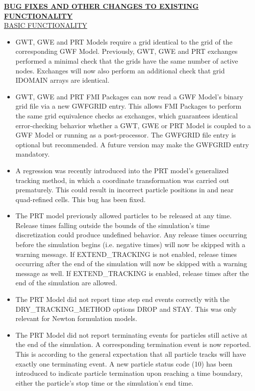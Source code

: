 \textbf{\underline{BUG FIXES AND OTHER CHANGES TO EXISTING FUNCTIONALITY}} \\
\underline{BASIC FUNCTIONALITY}
\begin{itemize}
	\item GWT, GWE and PRT Models require a grid identical to the grid of the corresponding GWF Model. Previously, GWT, GWE and PRT exchanges performed a minimal check that the grids have the same number of active nodes. Exchanges will now also perform an additional check that grid IDOMAIN arrays are identical.
	\item GWT, GWE and PRT FMI Packages can now read a GWF Model's binary grid file via a new GWFGRID entry. This allows FMI Packages to perform the same grid equivalence checks as exchanges, which guarantees identical error-checking behavior whether a GWT, GWE or PRT Model is coupled to a GWF Model or running as a post-processor. The GWFGRID file entry is optional but recommended. A future version may make the GWFGRID entry mandatory.
	\item A regression was recently introduced into the PRT model's generalized tracking method, in which a coordinate transformation was carried out prematurely. This could result in incorrect particle positions in and near quad-refined cells. This bug has been fixed.
	\item The PRT model previously allowed particles to be released at any time. Release times falling outside the bounds of the simulation's time discretization could produce undefined behavior. Any release times occurring before the simulation begins (i.e. negative times) will now be skipped with a warning message. If EXTEND\_TRACKING is not enabled, release times occurring after the end of the simulation will now be skipped with a warning message as well. If EXTEND\_TRACKING is enabled, release times after the end of the simulation are allowed.
	\item The PRT Model did not report time step end events correctly with the DRY\_TRACKING\_METHOD options DROP and STAY. This was only relevant for Newton formulation models.
	\item The PRT Model did not report terminating events for particles still active at the end of the simulation. A corresponding termination event is now reported. This is according to the general expectation that all particle tracks will have exactly one terminating event. A new particle status code (10) has been introduced to indicate particle termination upon reaching a time boundary, either the particle's stop time or the simulation's end time.

\end{itemize}

